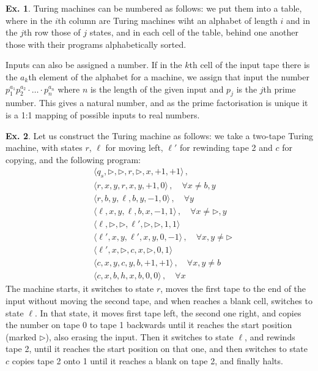 \documentclass[a4paper,12pt]{article}
\theoremstyle{definition}
\newtheorem{exercise}{Ex.}[section]
\begin{document}
\begin{exercise}
 Turing machines can be numbered as follows: we put them into a table, where in the $i$th column are Turing machines wiht an alphabet of length $i$ and in the $j$th row those of $j$ states, and in each cell of the table, behind one another those with their programs alphabetically sorted.
 
 Inputs can also be assigned a number. If in the $k$th cell of the input tape there is the $a_k$th element of the alphabet for a machine, we assign that input the number $p_1^{a_1} p_2^{a_2} \cdot\dots\cdot p_n^{a_n}$ where $n$ is the length of the given input and $p_j$ is the $j$th prime number. This gives a natural number, and as the prime factorisation is unique it is a 1:1 mapping of possible inputs to real numbers.
\end{exercise}

\begin{exercise}
 Let us construct the Turing machine as follows: we take a two-tape Turing machine, with states $r$, $\ell$ for moving left, $\ell'$ for rewinding tape 2 and $c$ for copying, and the following program:
 \[
  \begin{aligned}
   &\langle q_s, \triangleright, \triangleright, r, \triangleright, x, +1, +1\rangle\,,\\
   &\langle r, x, y, r, x, y, +1,0\rangle\,,\quad \forall x\ne b,y\\
   &\langle r, b,y,\ell,b,y,-1,0\rangle\,,\quad \forall y\\
   &\langle \ell, x,y,\ell, b, x, -1, 1\rangle\,,\quad\forall x\ne \triangleright, y\\
   &\langle \ell,\triangleright,\triangleright, \ell',\triangleright,\triangleright,1,1\rangle\\
   &\langle \ell', x, y, \ell', x, y, 0, -1 \rangle\,,\quad \forall x, y\ne \triangleright\\
   &\langle \ell', x, \triangleright, c, x, \triangleright, 0, 1\rangle\\
   &\langle c, x, y, c, y, b, +1, +1\rangle\,,\quad \forall x, y\ne b\\
   &\langle  c, x, b, h, x, b, 0, 0\rangle\,,\quad \forall x
  \end{aligned}
 \]
 The machine starts, it switches to state $r$, moves the first tape to the end of the input without moving the second tape, and when reaches a blank cell, switches to state $\ell$. In that state, it moves first tape left, the second one right, and copies the number on tape 0 to tape 1 backwards until it reaches the start position (marked $\triangleright$), also erasing the input. Then it switches to state $\ell$, and rewinds tape 2, until it reaches the start position on that one, and then switches to state $c$ copies tape 2 onto 1 until it reaches a blank on tape 2, and finally halts.
\end{exercise}
\end{document}

